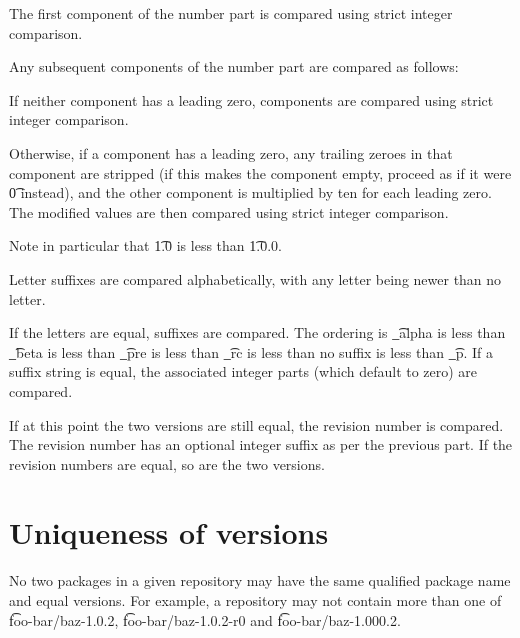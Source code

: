 The first component of the number part is compared using strict integer comparison.

Any subsequent components of the number part are compared as follows:

\begin{bulletlist}
\item If neither component has a leading zero, components are compared using strict integer
  comparison.
\item Otherwise, if a component has a leading zero, any trailing zeroes in that component
  are stripped (if this makes the component empty, proceed as if it were \t{0} instead),
  and the other component is multiplied by ten for each leading zero. The
  modified values are then compared using strict integer comparison.
\end{bulletlist}

Note in particular that \t{1.0} is less than \t{1.0.0}.

Letter suffixes are compared alphabetically, with any letter being newer than no letter.

If the letters are equal, suffixes are compared. The ordering is \t{\_alpha} is less than
\t{\_beta} is less than \t{\_pre} is less than \t{\_rc} is less than no suffix is less than
\t{\_p}. If a suffix string is equal, the associated integer parts (which default to zero)
are compared.

If at this point the two versions are still equal, the revision number is compared. The revision
number has an optional integer suffix as per the previous part. If the revision numbers are equal,
so are the two versions.

\section{Uniqueness of versions}

No two packages in a given repository may have the same qualified package name and equal versions.
For example, a repository may not contain more than one of \t{foo-bar/baz-1.0.2},
\t{foo-bar/baz-1.0.2-r0} and \t{foo-bar/baz-1.000.2}.

